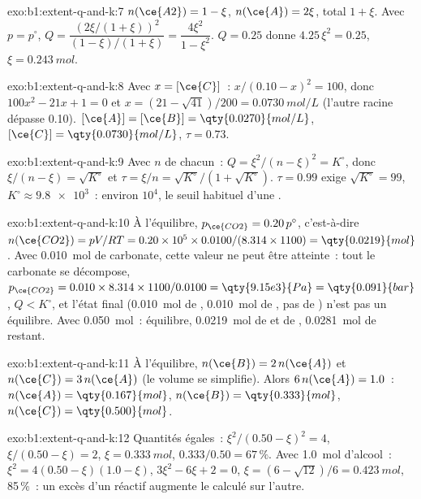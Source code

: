 \begin{solution}{exo:b1:extent-q-and-k:7}
$n(\ce{A2}) = 1 - \xi$, $n(\ce{A}) = 2\xi$, total $1 + \xi$. Avec $p =
p^\circ$, $Q = \dfrac{(2\xi/(1+\xi))^2}{(1-\xi)/(1+\xi)} = \dfrac{4\xi^2}{1 -
\xi^2}$. $Q = 0.25$ donne $4.25\,\xi^2 = 0.25$, $\xi = \qty{0.243}{mol}$.
\end{solution}

\begin{solution}{exo:b1:extent-q-and-k:8}
Avec $x = [\ce{C}]$~: $x/(0.10 - x)^2 = 100$, donc $100x^2 - 21x + 1 = 0$
et $x = (21 - \sqrt{41})/200 = \qty{0.0730}{mol/L}$ (l'autre racine
dépasse 0.10). $[\ce{A}] = [\ce{B}] = \qty{0.0270}{mol/L}$, $[\ce{C}] =
\qty{0.0730}{mol/L}$, $\tau = 0.73$.
\end{solution}

\begin{solution}{exo:b1:extent-q-and-k:9}
Avec $n$ de chacun~: $Q = \xi^2/(n - \xi)^2 = K^\circ$, donc
$\xi/(n - \xi) =
\sqrt{K^\circ}$ et $\tau = \xi/n = \sqrt{K^\circ}/(1 + \sqrt{K^\circ})$.
$\tau = 0.99$ exige $\sqrt{K^\circ} = 99$, $K^\circ \approx \num{9.8e3}$~:
environ $10^4$, le seuil habituel d'une .
\end{solution}

\begin{solution}{exo:b1:extent-q-and-k:10}
À l'équilibre, $p_{\ce{CO2}} = 0.20\,p^\circ$, c'est-à-dire $n(\ce{CO2}) =
pV/RT = 0.20 \times 10^5 \times 0.0100/(8.314 \times 1100) =
\qty{0.0219}{mol}$. Avec \qty{0.010}{mol} de carbonate, cette valeur ne
peut être atteinte~: tout le carbonate se décompose, $p_{\ce{CO2}} = 0.010 \times 8.314 \times
1100/0.0100 = \qty{9.15e3}{Pa} = \qty{0.091}{bar}$, $Q < K^\circ$, et
l'état final (\qty{0.010}{mol} de , \qty{0.010}{mol} de
, pas de ) n'est pas un équilibre. Avec
\qty{0.050}{mol}~: équilibre, \qty{0.0219}{mol} de  et de
, \qty{0.0281}{mol} de  restant.
\end{solution}

\begin{solution}{exo:b1:extent-q-and-k:11}
À l'équilibre, $n(\ce{B}) = 2\,n(\ce{A})$ et $n(\ce{C}) = 3\,n(\ce{A})$
(le volume se simplifie). Alors $6\,n(\ce{A}) = 1.0$~: $n(\ce{A}) =
\qty{0.167}{mol}$, $n(\ce{B}) = \qty{0.333}{mol}$, $n(\ce{C}) =
\qty{0.500}{mol}$.
\end{solution}

\begin{solution}{exo:b1:extent-q-and-k:12}
Quantités égales~: $\xi^2/(0.50 - \xi)^2 = 4$, $\xi/(0.50 - \xi) = 2$,
$\xi = \qty{0.333}{mol}$,  $0.333/0.50 = 67\,\%$. Avec
\qty{1.0}{mol} d'alcool~: $\xi^2 = 4(0.50 - \xi)(1.0 - \xi)$,
$3\xi^2 - 6\xi + 2 = 0$,
$\xi = (6 - \sqrt{12})/6 = \qty{0.423}{mol}$,  85\,\%~: un
excès d'un réactif augmente le  calculé sur l'autre.
\end{solution}

